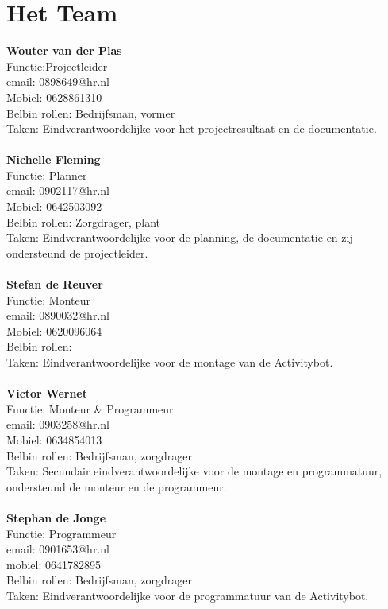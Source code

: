 \documentclass[oneside]{book}
\begin{document}
\section*{Het Team}
\textbf{Wouter van der Plas}\\
Functie:Projectleider\\
email: 0898649@hr.nl\\
Mobiel: 0628861310\\
Belbin rollen: Bedrijfsman, vormer\\
Taken: Eindverantwoordelijke voor het  projectresultaat en de documentatie.\\
\\
\textbf{Nichelle Fleming}\\
Functie: Planner\\
email: 0902117@hr.nl\\
Mobiel: 0642503092\\
Belbin rollen: Zorgdrager, plant\\
Taken: Eindverantwoordelijke voor de planning, de documentatie en zij ondersteund de projectleider.\\
\\
\clearpage
\textbf{Stefan de Reuver}\\
Functie: Monteur\\
email: 0890032@hr.nl\\
Mobiel: 0620096064\\
Belbin rollen:\\
Taken: Eindverantwoordelijke voor de montage van de Activitybot.\\
\\
\textbf{Victor Wernet}\\
Functie: Monteur \& Programmeur\\
email: 0903258@hr.nl\\
Mobiel: 0634854013\\
Belbin rollen: Bedrijfsman, zorgdrager\\
Taken: Secundair eindverantwoordelijke voor de montage en programmatuur, ondersteund de monteur en de programmeur.\\
\\
\textbf{Stephan de Jonge}\\
Functie: Programmeur\\
email: 0901653@hr.nl\\
mobiel: 0641782895\\
Belbin rollen: Bedrijfsman, zorgdrager\\
Taken: Eindverantwoordelijke voor de programmatuur van de Activitybot.
\end{document}
